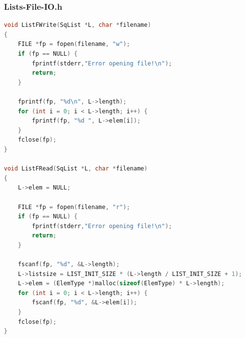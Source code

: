 \documentclass[supercite]{Experimental_Report}
\theoremstyle{definition}
\begin{document}
\subsubsection*{Lists-File-IO.h}
\begin{lstlisting}[language=C, caption={Lists-File-IO.h}, label=lst:lists_file_io_h]
	void ListFWrite(SqList *L, char *filename)
{
    FILE *fp = fopen(filename, "w");
    if (fp == NULL) {
        fprintf(stderr,"Error opening file!\n");
        return;
    }

    fprintf(fp, "%d\n", L->length);
    for (int i = 0; i < L->length; i++) {
        fprintf(fp, "%d ", L->elem[i]);
    }
    fclose(fp);
}

void ListFRead(SqList *L, char *filename)
{
    L->elem = NULL;

    FILE *fp = fopen(filename, "r");
    if (fp == NULL) {
        fprintf(stderr,"Error opening file!\n");
        return;
    }

    fscanf(fp, "%d", &L->length);
    L->listsize = LIST_INIT_SIZE * (L->length / LIST_INIT_SIZE + 1);
    L->elem = (ElemType *)malloc(sizeof(ElemType) * L->length);
    for (int i = 0; i < L->length; i++) {
        fscanf(fp, "%d", &L->elem[i]);
    }
    fclose(fp);
}

\end{lstlisting}
\end{document}
